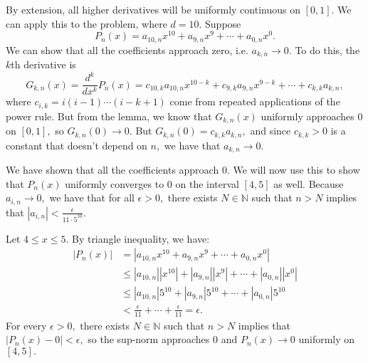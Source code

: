 \documentclass{article}
\numberwithin{equation}{section}
\begin{document}
\begin{enumerate}
    By extension, all higher derivatives will be uniformly continuous on $[0,1].$ We can apply this to the problem, where $d=10.$ Suppose 
    \begin{equation}
        P_n(x) = a_{10,n} x^{10} + a_{9,n} x^9 + \cdots + a_{0,n} x^0.
    \end{equation}
    We can show that all the coefficients approach zero, i.e. $a_{k,n} \to 0.$ To do this, the $k$th derivative is 
    \begin{equation}
        G_{k,n}(x) = \frac{d^k}{dx^k}P_n(x) = c_{10,k} a_{10,n} x^{10-k} + c_{9,k} a_{9,n} x^{9-k} + \cdots + c_{k,k} a_{k,n},
    \end{equation}
    where $c_{i,k} = i(i-1)\cdots (i-k+1)$ come from repeated applications of the power rule. But from the lemma, we know that $G_{k,n}(x)$ uniformly approaches $0$ on $[0,1],$ so $G_{k,n}(0) \to 0.$ But $G_{k,n}(0)=c_{k,k}a_{k,n},$ and since $c_{k,k} > 0$ is a constant that doesn't depend on $n,$ we have that $a_{k,n} \to 0.$

    We have shown that all the coefficients approach $0.$ We will now use this to show that $P_n(x)$ uniformly converges to $0$ on the interval $[4,5]$ as well. Because $a_{i,n}\to 0,$ we have that for all $\epsilon > 0,$ there exists $N\in \mathbb{N}$ such that $n>N$ implies that $|a_{i,n}| < \frac{\epsilon}{11 \cdot 5^{10}}.$
    
    
    Let $4 \le x \le 5.$ By triangle inequality, we have:
    \begin{align}
        |P_n(x)| &= |a_{10,n}x^{10} + a_{9,n}x^9 + \cdots + a_{0,n}x^0| \\ 
        &\le |a_{10,n}| |x^{10}| + |a_{9,n}| |x^9| + \cdots + |a_{0,n}| |x^0| \\
        &\le |a_{10,n}| 5^{10} + |a_{9,n}| 5^{10} + \cdots + |a_{0,n}| 5^{10} \\
        &< \frac{\epsilon}{11} + \cdots + \frac{\epsilon}{11} = \epsilon.
    \end{align}
    For every $\epsilon > 0,$ there exists $N\in \mathbb{N}$ such that $n>N$ implies that $|P_n(x)-0|<\epsilon,$ so the sup-norm approaches $0$ and $P_n(x) \to 0$ uniformly on $[4,5].$    
\end{enumerate}
\end{document}
